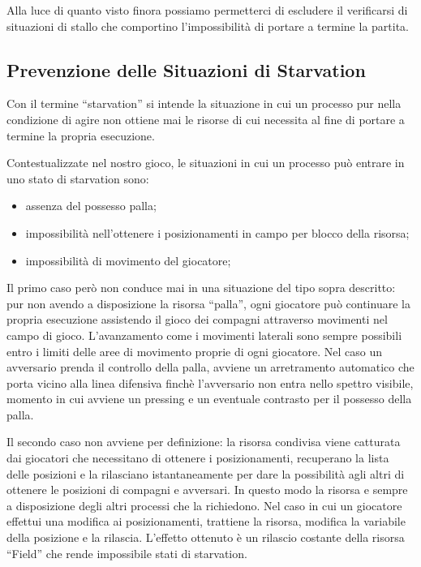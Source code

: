 \documentclass[aps,letterpaper,10pt]{article}
\begin{document}
Alla luce di quanto visto finora possiamo permetterci di escludere il verificarsi di situazioni di stallo che comportino l'impossibilit\`a di portare a termine la partita.

\subsection{Prevenzione delle Situazioni di Starvation}
\label{starvation}

Con il termine ``starvation'' si intende la situazione in cui un processo pur nella condizione di agire non ottiene mai le risorse di cui necessita al fine di portare a termine la propria esecuzione. \vspace{3mm}

Contestualizzate nel nostro gioco, le situazioni in cui un processo pu\`o entrare in uno stato di starvation sono:

\begin{itemize}
	\item assenza del possesso palla;
	\item impossibilit\`a nell'ottenere i posizionamenti in campo per blocco della risorsa;
	\item impossibilit\`a di movimento del giocatore;
\end{itemize}

Il primo caso per\`o non conduce mai in una situazione del tipo sopra descritto: pur non avendo a disposizione la risorsa ``palla'', ogni giocatore pu\`o continuare la propria esecuzione assistendo il gioco dei compagni attraverso movimenti nel campo di gioco. L'avanzamento come i movimenti laterali sono sempre possibili entro i limiti delle aree di movimento proprie di ogni giocatore. Nel caso un avversario prenda il controllo della palla, avviene un arretramento automatico che porta vicino alla linea difensiva finch\`e l'avversario non entra nello spettro visibile, momento in cui avviene un pressing e un eventuale contrasto per il possesso della palla. \vspace{3mm}

Il secondo caso non avviene per definizione: la risorsa condivisa viene catturata dai giocatori che necessitano di ottenere i posizionamenti, recuperano la lista delle posizioni e la rilasciano istantaneamente per dare la possibilit\`a agli altri di ottenere le posizioni di compagni e avversari. In questo modo la risorsa e sempre a disposizione degli altri processi che la richiedono. Nel caso in cui un giocatore effettui una modifica ai posizionamenti, trattiene la risorsa, modifica la variabile della posizione e la rilascia. L'effetto ottenuto \`e un rilascio costante della risorsa ``Field'' che rende impossibile stati di starvation. \vspace{3mm}
\end{document}
